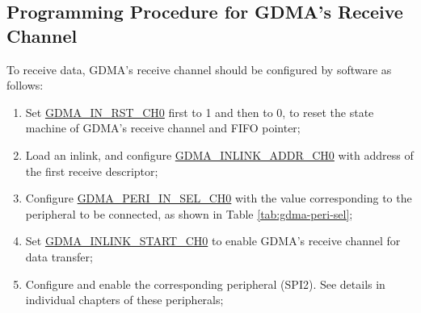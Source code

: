 \documentclass[main\_\_EN.tex]{subfiles}
\begin{document}
\subsection{Programming Procedure for GDMA's Receive Channel}\label{rx-program}
To receive data, GDMA's receive channel should be configured by software as follows:
\begin{enumerate}
    \item Set \hyperref[fielddesc:GDMAINRSTCH0]{GDMA\_IN\_RST\_CH0} first to 1 and then to 0, to reset the state machine of GDMA's receive channel and FIFO pointer;
    \item Load an inlink, and configure \hyperref[fielddesc:GDMAINLINKADDRCH0]{GDMA\_INLINK\_ADDR\_CH0} with address of the first receive descriptor;
    \item Configure \hyperref[fielddesc:GDMAPERIINSELCH0]{GDMA\_PERI\_IN\_SEL\_CH0} with the value corresponding to the peripheral to be connected, as shown in Table \ref{tab:gdma-peri-sel};
    \item Set \hyperref[fielddesc:GDMAINLINKSTARTCH0]{GDMA\_INLINK\_START\_CH0} to enable GDMA's receive channel for data transfer;
    \item Configure and enable the corresponding peripheral (SPI2). See details in individual chapters of these peripherals;
\end{enumerate}
\end{document}
